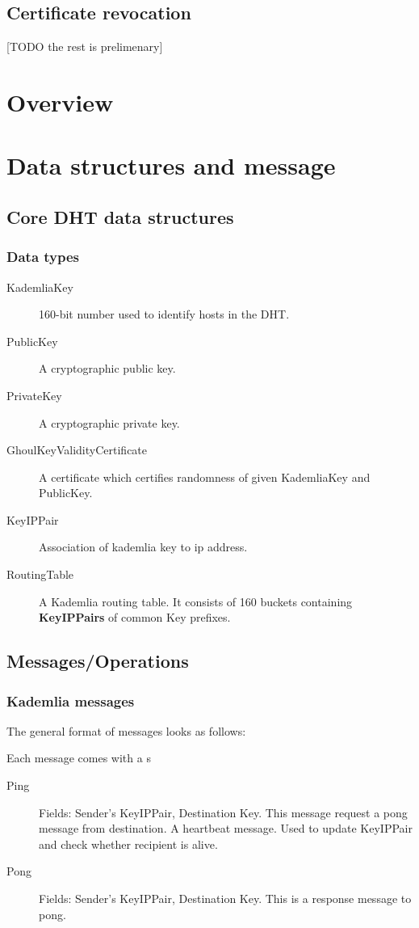 \subsection{Certificate revocation}

[TODO the rest is prelimenary]
\section{Overview}


\section{Data structures and message}

\subsection{Core DHT data structures}
\subsubsection{Data types}
\begin{description}
  \item[KademliaKey] 160-bit number used to identify hosts in the DHT. 
  \item[PublicKey] A cryptographic public key.
  \item[PrivateKey] A cryptographic private key.
  \item[GhoulKeyValidityCertificate] A certificate which certifies randomness of
    given KademliaKey and PublicKey.
  \item[KeyIPPair] Association of kademlia key to ip address.
  \item[RoutingTable] A Kademlia routing table. It consists of 160 buckets
    containing \textbf{KeyIPPairs} of common Key prefixes.
\end{description}

\subsection{Messages/Operations}
\subsubsection{Kademlia messages}
The general format of messages looks as follows:

Each message comes with a s
\begin{description}
  \item[Ping] Fields: Sender's KeyIPPair, Destination Key.  This message request
    a pong message from destination. A heartbeat message. Used to update
    KeyIPPair and check whether recipient is alive.
  \item[Pong] Fields: Sender's KeyIPPair, Destination Key.  This is a response
    message to pong.
\end{description}

